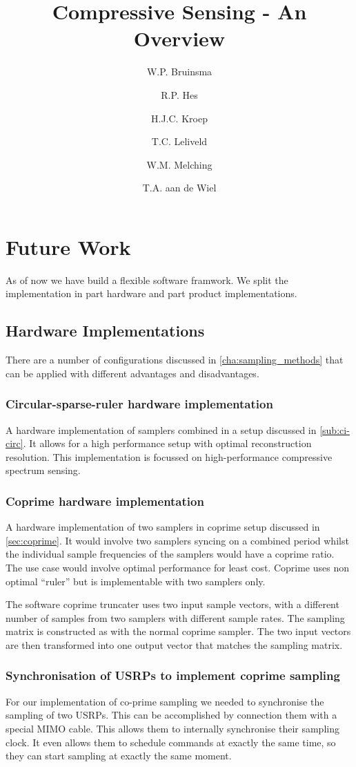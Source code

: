 \documentclass[a4paper, openany, oneside]{memoir}
\title{Compressive Sensing - An Overview}
\author{W.P. Bruinsma \and R.P. Hes \and H.J.C. Kroep \and T.C. Leliveld \and W.M. Melching \and T.A. aan de Wiel}
\begin{document}
\chapter{Future Work}
\label{cha:futurework}
As of now we have build a flexible software framwork. We split the implementation in part hardware and part product implementations.

\section{Hardware Implementations}
\label{sec:hardware_implementations}
There are a number of configurations discussed in \cref{cha:sampling_methods} that can be applied with different advantages and disadvantages.

\subsection{Circular-sparse-ruler hardware implementation}
\label{sub:minimal_sparse_ruler_hardware_implementation}
A hardware implementation of samplers combined in a setup discussed in \cref{sub:ci-circ}. It allows for a high performance setup with optimal reconstruction resolution. This implementation is focussed on high-performance compressive spectrum sensing.

\subsection{Coprime hardware implementation}
\label{sub:coprime_hardwa}
A hardware implementation of two samplers in coprime setup discussed in \cref{sec:coprime}. It would involve two samplers syncing on a combined period whilst the individual sample frequencies of the samplers would have a coprime ratio. The use case would involve optimal performance for least cost. Coprime uses non optimal ``ruler'' but is implementable with two samplers only.

The software coprime truncater uses two input sample vectors, with a different number of samples from two samplers with different sample rates. The sampling matrix is constructed as with the normal coprime sampler. The two input vectors are then transformed into one output vector that matches the sampling matrix.

\subsection{Synchronisation of USRPs to implement coprime sampling}
For our implementation of co-prime sampling we needed to synchronise the sampling of two USRPs. This can be accomplished by connection them with a special MIMO cable. This allows them to internally synchronise their sampling clock. It even allows them to schedule commands at exactly the same time, so they can start sampling at exactly the same moment.
\end{document}
